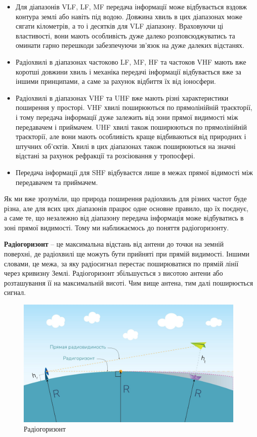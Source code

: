 \documentclass{article}
\begin{document}
\begin{itemize}[noitemsep, topsep=8pt]
	\item Для діапазонів VLF, LF, MF передача інформації може відбувається вздовж контура землі або навіть під водою. Довжина хвиль в цих діапазонах може сягати кілометрів, а то і десятків для VLF діапазону. Враховуючи ці властивості, вони мають особливість дуже далеко розповсюджуватись та оминати гарно перешкоди забезпечуючи зв'язок на дуже далеких відстанях. 
	\item Радіохвилі в діапазонах частоково LF, MF, HF та частоков VHF мають вже коротші довжини хвиль і механіка передачі інформації відбувається вже за іншими принципами, а саме за рахунок відбиття їх від іоносфери.
	\item Радіохвилі в діапазонах VHF та UHF вже мають різні характеристики поширення у просторі. VHF хвилі поширюються по прямолінійній траєкторії, і тому передача інформації дуже залежить від зони прямої видимості між передавачем і приймачем. UHF хвилі також поширюються по прямолінійній траєкторії, але вони мають особливість краще відбиваються від природних і штучних об'єктів. Хвилі в цих діапазонах також поширюються на значні відстані за рахунок рефракції та розсіювання у тропосфері.
	\item Передача інформації для SHF відбуваєтся лише в межах прямої відимості між передавачем та приймачем.
\end{itemize}

Як ми вже зрозуміли, що природа поширення радіохвиль для різних частот буде різна, але для всих цих діапазонів працює одне основне правило, що їх поєднує, а саме те, що незалежно від діапазону передача інформація може відбуватись в зоні прямої видимості. Тому ми наближаємось до поняття радіогоризонту.   

\textbf{Радіогоризонт} -- це максимальна відстань від антени до точки на земній поверхні, де радіохвилі ще можуть бути прийняті при прямій видимості. Іншими словами, це межа, за яку радіосигнал перестає поширюватися по прямій лінії через кривизну Землі. Радіогоризонт збільшується з висотою антени або розташування її на максимальній висоті. Чим вище антена, тим далі поширюється сигнал.

\begin{figure}[h!]
\centering
\includegraphics[width=0.6\linewidth]{images/radio-horizon.jpeg}
\caption{\label{fig:radio-horizon}Радіогоризонт}
\end{figure}
\end{document}
